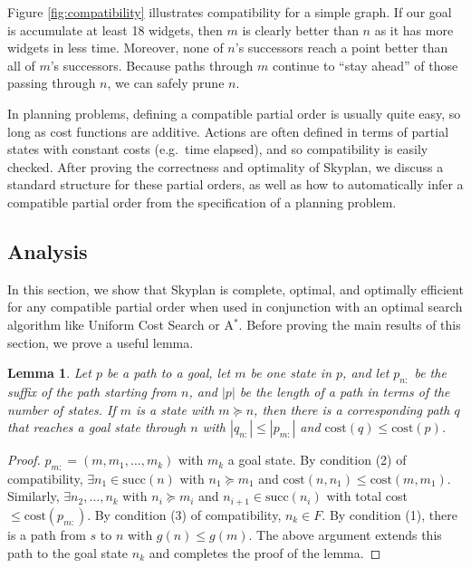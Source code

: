\documentclass[letterpaper]{article}
\theoremstyle{plain} \newtheorem{theorem}{Theorem} \newtheorem{proposition}{Proposition} \newtheorem{lemma}{Lemma}
\theoremstyle{definition} \newtheorem{definition}{Definition} \newtheorem{conjecture}{Conjecture} \newtheorem*{example}{Example}
\theoremstyle{remark} \newtheorem*{remark}{Remark} \newtheorem*{note}{Note} \newtheorem{case}{Case}
\newcommand{\Astar}{A$^*$}
\begin{document}
Figure \ref{fig:compatibility} illustrates 
compatibility for a simple graph. If our goal is accumulate at
least 18 widgets, then $m$ is clearly better than $n$ as
it has more widgets in less time. Moreover, none
of $n$'s successors reach a point better than all of $m$'s 
successors. Because paths through $m$ continue to
``stay ahead'' of those passing through $n$, we
can safely prune $n$.

In planning problems, defining a compatible partial order is usually
quite easy, so long as cost functions are additive.  Actions are
often defined in terms of partial states with constant costs (e.g.\
time elapsed), and so compatibility is easily checked.  After proving
the correctness and optimality of Skyplan, we discuss a standard
structure for these partial orders, as well as how to automatically
infer a compatible partial order from the specification of a planning problem.

\subsection{Analysis}

In this section, we show that Skyplan is complete, optimal, and
optimally efficient for any compatible partial order when used in
conjunction with an optimal search algorithm like Uniform Cost
Search or \Astar. Before proving the main results of this section,
we prove a useful lemma.

\begin{lemma}{}\label{clm-complete-lemma}
  Let $p$ be a path to a goal, let $m$ be one state in $p$, and let 
$p_{n:}$ be the suffix of the path starting from $n$, and $|p|$
be
the length of a path in terms of the number of states. If $m$ is a state
with $m \succeq n$, then there is a corresponding path $q$ that reaches a goal state
through $n$ with $|q_{n:}| \leq |p_{m:}|$ and $\mathrm{cost}(q) \leq \mathrm{cost}(p)$.
\end{lemma}

\begin{proof}
$p_{m:}=(m,m_{1},\dots,m_{k})$ with $m_{k}$ a goal state.
By condition (2) of compatibility, $\exists n_{1} \in \mathrm{succ}(n)$ 
with $n_{1} \succeq m_{1}$ and $\mathrm{cost}(n,n_{1}) \leq \mathrm{cost}(m,m_{1})$. 
Similarly, $\exists n_{2},\dots,n_{k}$ with 
$n_{i} \succeq m_{i}$ and $n_{i+1} \in \mathrm{succ}(n_{i})$ with 
total cost $\leq \mathrm{cost}(p_{m:})$.
By condition (3) of compatibility, $n_{k} \in F$. By condition (1),
there is a path from $s$ to $n$ with $g(n) \leq g(m)$. The above argument extends this path
to the goal state $n_{k}$ and completes the proof of the lemma.
\end{proof}
\end{document}
